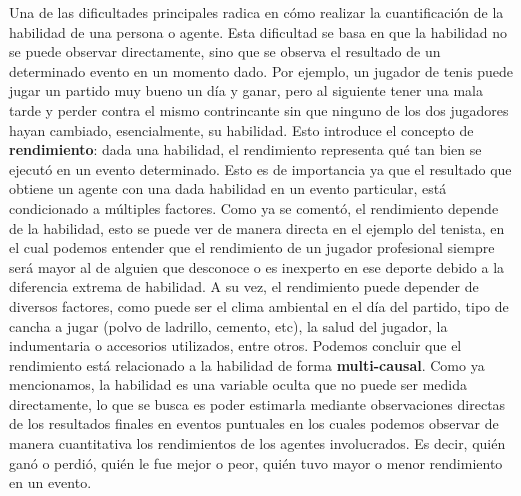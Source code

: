 \documentclass[11pt,twoside,spanish]{report} %
\begin{document}
Una de las dificultades principales radica en c\'omo realizar la cuantificaci\'on de la habilidad de una persona o agente.
Esta dificultad se basa en que la habilidad no se puede observar directamente, sino que se observa el resultado de un determinado evento en un momento dado.
Por ejemplo, un jugador de tenis puede jugar un partido muy bueno un d\'ia y ganar, pero al siguiente tener una mala tarde y perder contra el mismo contrincante sin que ninguno de los dos jugadores hayan cambiado, esencialmente, su habilidad.
Esto introduce el concepto de \textbf{rendimiento}: dada una habilidad, el rendimiento representa qu\'e tan bien se ejecut\'o en un evento determinado.
Esto es de importancia ya que el resultado que obtiene un agente con una dada habilidad en un evento particular, est\'a condicionado a m\'ultiples factores.
Como ya se coment\'o, el rendimiento depende de la habilidad, esto se puede ver de manera directa en el ejemplo del tenista, en el cual podemos entender que el rendimiento de un jugador profesional siempre ser\'a mayor al de alguien que desconoce o es inexperto en ese deporte debido a la diferencia extrema de habilidad.
A su vez, el rendimiento puede depender de diversos factores, como puede ser el clima ambiental en el d\'ia del partido, tipo de cancha a jugar (polvo de ladrillo, cemento, etc), la salud del jugador, la indumentaria o accesorios utilizados, entre otros.
Podemos concluir que el rendimiento est\'a relacionado a la habilidad de forma \textbf{multi-causal}.
Como ya mencionamos, la habilidad es una variable oculta que no puede ser medida directamente, lo que se busca es poder estimarla mediante observaciones directas de los resultados finales en eventos puntuales en los cuales podemos observar de manera cuantitativa los rendimientos de los agentes involucrados.
Es decir, qui\'en gan\'o o perdi\'o, qui\'en le fue mejor o peor, qui\'en tuvo mayor o menor rendimiento en un evento.
\end{document}
